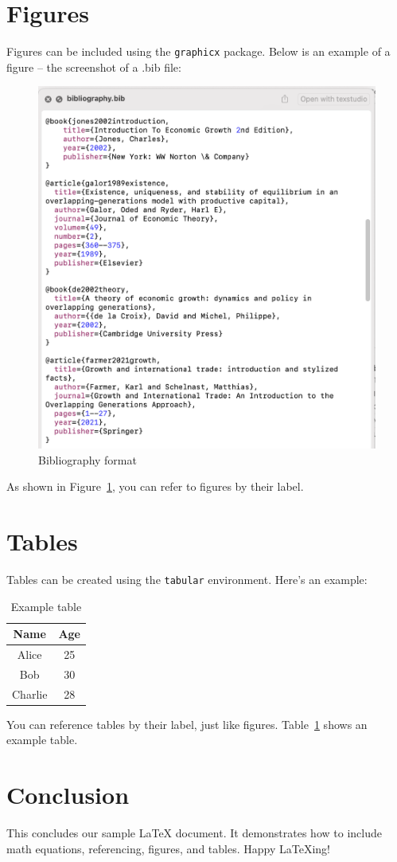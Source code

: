 \documentclass[11p,a4paper]{article}
\begin{document}
\section{Figures}\label{sec:figures}
Figures can be included using the \texttt{graphicx} package. Below is an example of a figure -- the screenshot of a .bib file:

\begin{figure}[H]
    \centering
    \includegraphics[width=0.6\linewidth]{bib_fig.png}
    \caption{Bibliography format}
    \label{fig:example}
\end{figure}

As shown in Figure~\ref{fig:example}, you can refer to figures by their label.

\section{Tables}
Tables can be created using the \texttt{tabular} environment. Here's an example:

\begin{table}[htb]
    \centering
    \begin{tabular}{c c}
        \hline
        Name & Age \\
        \hline
        Alice & 25 \\
        Bob & 30 \\
        Charlie & 28 \\
        \hline
    \end{tabular}
    \caption{Example table}
    \label{tab:example}
\end{table}

You can reference tables by their label, just like figures. Table~\ref{tab:example} shows an example table.

\section{Conclusion}
This concludes our sample LaTeX document. It demonstrates how to include math equations, referencing, figures, and tables. Happy LaTeXing!




\end{document}
